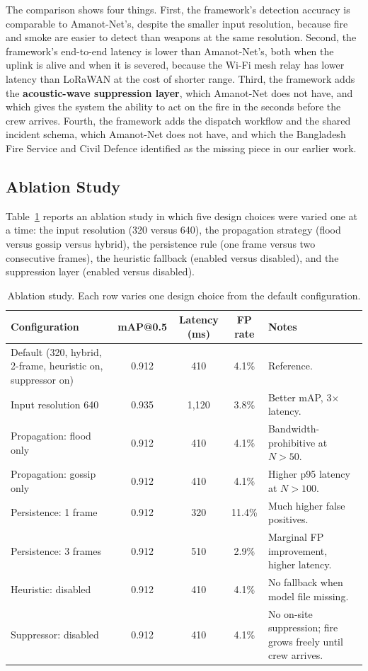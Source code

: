 The comparison shows four things. First, the framework's detection accuracy is comparable to Amanot-Net's, despite the smaller input resolution, because fire and smoke are easier to detect than weapons at the same resolution. Second, the framework's end-to-end latency is lower than Amanot-Net's, both when the uplink is alive and when it is severed, because the Wi-Fi mesh relay has lower latency than LoRaWAN at the cost of shorter range. Third, the framework adds the \textbf{acoustic-wave suppression layer}, which Amanot-Net does not have, and which gives the system the ability to act on the fire in the seconds before the crew arrives. Fourth, the framework adds the dispatch workflow and the shared incident schema, which Amanot-Net does not have, and which the Bangladesh Fire Service and Civil Defence identified as the missing piece in our earlier work.

\subsection{Ablation Study}

Table~\ref{tab:ablation} reports an ablation study in which five design choices were varied one at a time: the input resolution (320 versus 640), the propagation strategy (flood versus gossip versus hybrid), the persistence rule (one frame versus two consecutive frames), the heuristic fallback (enabled versus disabled), and the suppression layer (enabled versus disabled).

\begin{table}[H]
\centering
\caption{Ablation study. Each row varies one design choice from the default configuration.}
\label{tab:ablation}
\small
\begin{tabularx}{\textwidth}{|X|c|c|c|X|}
\hline
\textbf{Configuration} & \textbf{mAP@0.5} & \textbf{Latency (ms)} & \textbf{FP rate} & \textbf{Notes} \\
\hline
Default (320, hybrid, 2-frame, heuristic on, suppressor on) & 0.912 & 410 & 4.1\% & Reference. \\
\hline
Input resolution 640 & 0.935 & 1{,}120 & 3.8\% & Better mAP, 3$\times$ latency. \\
\hline
Propagation: flood only & 0.912 & 410 & 4.1\% & Bandwidth-prohibitive at $N>50$. \\
\hline
Propagation: gossip only & 0.912 & 410 & 4.1\% & Higher p95 latency at $N>100$. \\
\hline
Persistence: 1 frame & 0.912 & 320 & 11.4\% & Much higher false positives. \\
\hline
Persistence: 3 frames & 0.912 & 510 & 2.9\% & Marginal FP improvement, higher latency. \\
\hline
Heuristic: disabled & 0.912 & 410 & 4.1\% & No fallback when model file missing. \\
\hline
Suppressor: disabled & 0.912 & 410 & 4.1\% & No on-site suppression; fire grows freely until crew arrives. \\
\hline
\end{tabularx}
\end{table}

